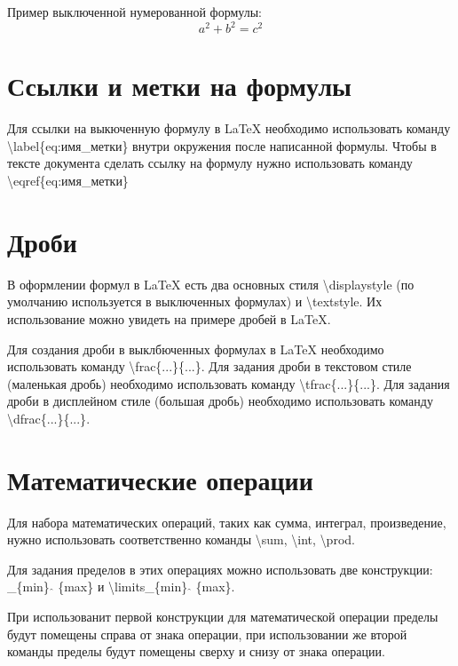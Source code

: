 \documentclass[a4paper,12pt]{article}
\begin{document}
{Пример выключенной нумерованной формулы:
\begin{equation}
    a^2 + b^2 = c^2
\end{equation}
\section{Ссылки и метки на формулы}
\hspace{1.25cm}Для ссылки на выкюченную формулу в LaTeX необходимо использовать команду \textsf{\textbackslash label\{eq:имя\_метки\}} внутри окружения после написанной формулы.
Чтобы в тексте документа сделать ссылку на формулу нужно использовать команду \textsf{\textbackslash eqref\{eq:имя\_метки\}}

\section{Дроби}
\hspace{1.25cm}В оформлении формул в LaTeX есть два основных стиля \textsf{\textbackslash displaystyle} (по умолча\-нию используется в выключенных формулах) и \textsf{\textbackslash textstyle}.
Их использование можно увидеть на примере дробей в LaTeX.

Для создания дроби в выклбюченных формулах в LaTeX необходимо использовать команду \textsf{\textbackslash frac\{...\}\{...\}}.
Для задания дроби в текстовом стиле (маленькая дробь) необхо\-димо использовать команду \textsf{\textbackslash tfrac\{...\}\{...\}}.
Для задания дроби в дисплейном стиле (большая дробь) необходимо использовать команду \textsf{\textbackslash dfrac\{...\}\{...\}}.

\section{Математические операции}
\hspace{1.25cm}Для набора математических операций, таких как сумма, интеграл, произведение,
нужно использовать соответственно команды \textsf{\textbackslash sum}, \textsf{\textbackslash int}, \textsf{\textbackslash prod}.

Для задания пределов в этих операциях можно использовать две конструкции: \textsf{\_\{min\} $\widehat{}$ \{max\}} и \textsf{\textbackslash limits\_\{min\} $\widehat{}$ \{max\}}.

При использованит первой конструкции для математической операции пределы будут помещены справа от знака операции,
при использовании же второй команды пределы будут помещены сверху и снизу от знака операции.

}
\end{document}
